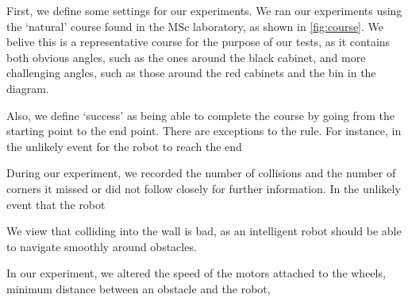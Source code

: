 \documentclass[a4paper,12pt]{article}
\begin{document}
First, we define some settings for our experiments. We ran our experiments using the `natural' course found in the MSc laboratory, as shown in \autoref{fig:course}. We belive this is a representative course for the purpose of our tests, as it contains both obvious angles, such as the ones around the black cabinet, and more challenging angles, such as those around the red cabinets and the bin in the diagram.

Also, we define `success' as being able to complete the course by going from the starting point to the end point. There are exceptions to the rule. For instance, in the unlikely event for the robot to reach the end



During our experiment, we recorded the number of collisions and the number of corners it missed or did not follow closely for further information. In the unlikely event that the robot

We view that colliding into the wall is bad, as an intelligent robot should be able to navigate smoothly around obstacles.

In our experiment, we altered the speed of the motors attached to the wheels, minimum distance between an obstacle and the robot, 





\end{document}
